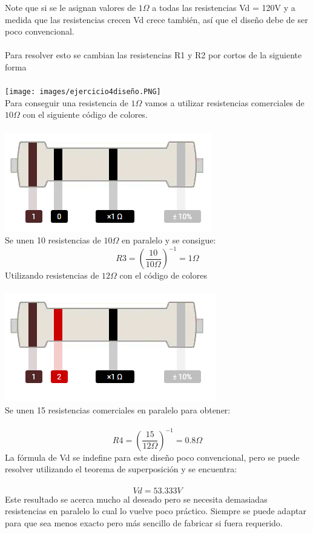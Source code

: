 \documentclass{article}
\begin{document}
Note que si se le asignan valores de ${1\Omega}$ a todas las resistencias Vd = 120V y a medida que las resistencias crecen Vd crece también, así que el diseño debe de ser poco convencional. \\ \\
Para resolver esto se cambian las resistencias R1 y R2 por cortos de la siguiente forma\\ \\ 
\texttt{[image: images/ejercicio4diseño.PNG]} \\
Para conseguir una resistencia de ${1\Omega}$ vamos a utilizar resistencias comerciales de ${10\Omega}$ con el siguiente código de colores. \\ \\
\includegraphics[]{images/resistencia.PNG} \\
Se unen 10 resistencias de ${10\Omega}$ en paralelo y se consigue:\\ 
\begin{equation}
    R3 = (\frac{10}{{10\Omega}})^{-1} = {1\Omega}
\end{equation}
Utilizando resistencias de ${12\Omega}$ con el código de colores \\ \\
 \includegraphics[]{images/resistencia1.PNG} \\
Se unen 15 resistencias comerciales en paralelo para obtener: \\ \\
\begin{equation}
    R4 = (\frac{15}{{12\Omega}})^{-1} = {0.8\Omega}
\end{equation}
La fórmula de Vd se indefine para este diseño poco convencional, pero se puede resolver utilizando el teorema de superposición y se encuentra: \\ \\
\begin{equation}
    Vd = 53.333V
\end{equation}
Este resultado se acerca mucho al deseado pero se necesita demasiadas resistencias en paralelo lo cual lo vuelve poco práctico. Siempre se puede adaptar para que sea menos exacto pero más sencillo de fabricar si fuera requerido.
\end{document}
